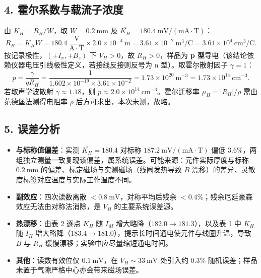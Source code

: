 \documentclass[12pt,a4paper]{ctexart}
\begin{document}
\subsection*{4. 霍尔系数与载流子浓度}
由 $K_H=R_H/W$，取 $W=0.2\ \mathrm{mm}$ 及 $\overline{K_H}=180.4\ \mathrm{mV/(mA\cdot T)}$：
\begin{equation}
    R_H=K_HW=180.4\ \frac{\mathrm{V}}{\mathrm{A\cdot T}}\times2.0\times10^{-4}\ \mathrm{m}
        =3.61\times10^{-2}\ \mathrm{m^3/C}=3.61\times10^{4}\ \mathrm{cm^3/C}.
\end{equation}
按记录极性，$(+I_x,+B_z)$ 下 $V_H>0$，故 $R_H>0$，样品为 \textbf{p 型}导电（该结论依赖仪器电压引线极性定义，若接线反接则反号为 n 型）。取霍尔散射因子 $\gamma=1$：
\begin{equation}
    p=\frac{\gamma}{qR_H}=\frac{1}{1.602\times10^{-19}\times3.61\times10^{-2}}
     =1.73\times10^{20}\ \mathrm{m^{-3}}=1.73\times10^{14}\ \mathrm{cm^{-3}} .
\end{equation}
若取声学波散射 $\gamma\approx1.18$，则 $p\approx2.0\times10^{14}\ \mathrm{cm^{-3}}$。霍尔迁移率 $\mu_H=|R_H|/\rho$ 需由范德堡法测得电阻率 $\rho$ 后方可求出，本次未测，故略。

\subsection*{5. 误差分析}
\begin{itemize}
    \item \textbf{与标称值偏差}：实测 $\overline{K_H}=180.4$ 对标称 $187.2\ \mathrm{mV/(mA\cdot T)}$ 偏低 $3.6\%$，两组独立测量一致复现该偏差，属系统误差。可能来源：元件实际厚度与标称 $0.2\ \mathrm{mm}$ 的偏差、标定磁场与实测磁场（线圈发热导致 $B$ 漂移）的差异、灵敏度标签对应温度与实际工作温度不同。
    \item \textbf{副效应}：四次读数离散 $<0.8\ \mathrm{mV}$，对称平均后残余 $<0.4\%$；残余厄廷豪森效应无法由对称法消除，是 $V_H$ 的主要系统误差源。
    \item \textbf{热漂移}：由表 2 逐点 $K_H$ 随 $I_M$ 增大略降（$182.0\!\to\!181.3$），以及表 1 中 $K_H$ 随 $I_H$ 增大略降（$183.4\!\to\!181.0$），提示长时间通电使元件与线圈升温，导致 $B$ 与 $R_H$ 缓慢漂移；实验中应尽量缩短通电时间。
    \item \textbf{其他}：读数有效位仅 $0.1\ \mathrm{mV}$，在 $V_H\!\sim\!33\ \mathrm{mV}$ 处引入约 $0.3\%$ 随机误差；样品未置于气隙严格中心亦会带来磁场误差。
\end{itemize}
\end{document}
